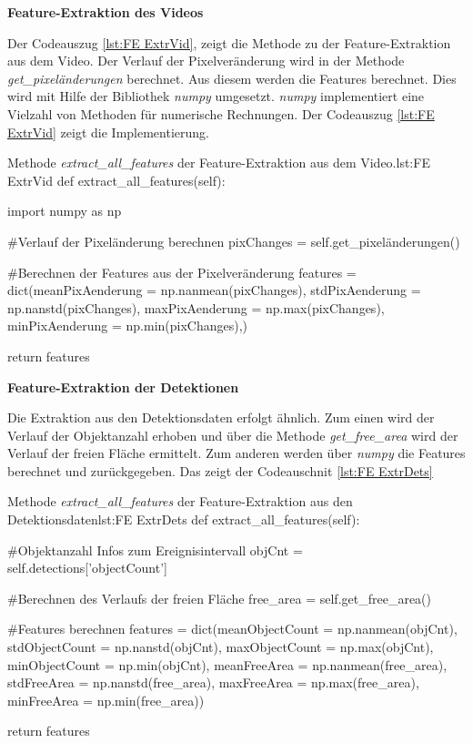 \textbf{Feature-Extraktion des Videos}\par

Der Codeauszug \ref{lst:FE ExtrVid}, zeigt die Methode zu der Feature-Extraktion aus dem Video. Der Verlauf der Pixelveränderung wird in der Methode \textit{get\_pixeländerungen} berechnet. Aus diesem werden die Features berechnet. Dies wird mit Hilfe der Bibliothek \textit{numpy} umgesetzt. \textit{numpy} implementiert eine Vielzahl von Methoden für numerische Rechnungen. Der Codeauszug \ref{lst:FE ExtrVid} zeigt die Implementierung.

\begin{pythoncode}{Methode \textit{extract\_all\_features} der Feature-Extraktion aus dem Video.}{lst:FE ExtrVid}
def extract_all_features(self):

    import numpy as np
        
    #Verlauf der Pixeländerung berechnen 
    pixChanges = self.get_pixeländerungen()

    #Berechnen der Features aus der Pixelveränderung
    features = dict(meanPixAenderung = np.nanmean(pixChanges),
                    stdPixAenderung = np.nanstd(pixChanges),
                    maxPixAenderung = np.max(pixChanges),
                    minPixAenderung = np.min(pixChanges),)
    
    return features

\end{pythoncode}

\dubpar
\textbf{Feature-Extraktion der Detektionen}\par

Die Extraktion aus den Detektionsdaten erfolgt ähnlich. Zum einen wird der Verlauf der Objektanzahl erhoben und über die Methode \textit{get\_free\_area} wird der Verlauf der freien Fläche ermittelt. Zum anderen werden über \textit{numpy} die Features berechnet und zurückgegeben. Das zeigt der Codeauschnit \ref{lst:FE ExtrDets}

\begin{pythoncode}{Methode \textit{extract\_all\_features} der Feature-Extraktion aus den Detektionsdaten}{lst:FE ExtrDets}
def extract_all_features(self):

    #Objektanzahl Infos zum Ereignisintervall
    objCnt = self.detections['objectCount']

    #Berechnen des Verlaufs der freien Fläche
    free_area = self.get_free_area()

    #Features berechnen
    features = dict(meanObjectCount = np.nanmean(objCnt),
                    stdObjectCount = np.nanstd(objCnt),
                    maxObjectCount = np.max(objCnt),
                    minObjectCount = np.min(objCnt),
                    meanFreeArea = np.nanmean(free_area),
                    stdFreeArea = np.nanstd(free_area),
                    maxFreeArea = np.max(free_area),
                    minFreeArea = np.min(free_area))

    return features

\end{pythoncode}

